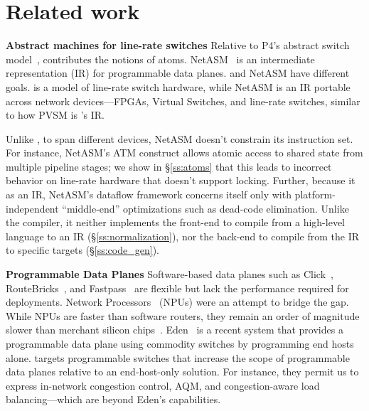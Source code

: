 \section{Related work}
\label{s:related}

\textbf{Abstract machines for line-rate switches}
Relative to P4's abstract switch model~\cite{p4}, \absmachine contributes the
notions of atoms. NetASM~\cite{netasm} is an intermediate representation (IR)
for programmable data planes. \absmachine and NetASM have different goals.
\absmachine is a model of line-rate switch hardware, while NetASM is an IR
portable across network devices---FPGAs, Virtual Switches, and line-rate
switches, similar to how PVSM is \pktlanguage's IR.

Unlike \absmachine, to span different devices, NetASM doesn't constrain its
instruction set. For instance, NetASM's ATM construct allows atomic access to
shared state from multiple pipeline stages; we show in \S\ref{ss:atoms} that
this leads to incorrect behavior on line-rate hardware that doesn't support
locking.  Further, because it as an IR, NetASM's dataflow framework concerns
itself only with platform-independent ``middle-end'' optimizations such as
dead-code elimination. Unlike the \pktlanguage compiler, it neither implements
the front-end to compile from a high-level language to an IR
(\S\ref{ss:normalization}), nor the back-end to compile from the IR to specific
targets (\S\ref{ss:code_gen}).

\textbf{Programmable Data Planes}
Software-based data planes such as Click~\cite{click},
RouteBricks~\cite{routebricks}, and Fastpass~\cite{fastpass} are flexible but
lack the performance required for deployments. Network
Processors~\cite{ixp2800, ixp4xx} (NPUs) were an attempt to bridge the gap.
While NPUs are faster than software routers, they remain an order of magnitude
slower than merchant silicon chips~\cite{rmt}. Eden~\cite{eden} is a recent
system that provides a programmable data plane using commodity switches by
programming end hosts alone. \pktlanguage targets programmable switches that
increase the scope of programmable data planes relative to an end-host-only
solution. For instance, they permit us to express in-network congestion
control, AQM, and congestion-aware load balancing---which are beyond Eden's
capabilities.


